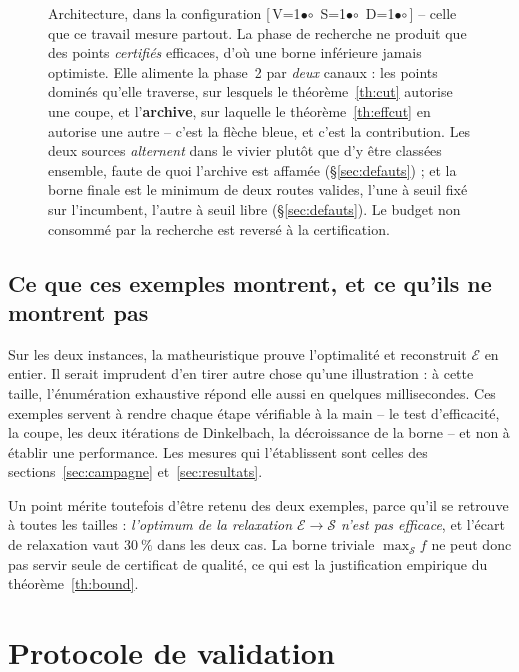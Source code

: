 \documentclass[11pt,a4paper]{article}
\theoremstyle{plain}
\theoremstyle{remark}
\newcommand{\Ecal}{\mathcal{E}}
\newcommand{\Scal}{\mathcal{S}}
\newcommand{\cfgm}[1]{\ifnum#1=1$\bullet$\else$\circ$\fi}
\newcommand{\conf}[3]{%
  \textsf{\footnotesize[\,V\cfgm{#1}\ S\cfgm{#2}\ D\cfgm{#3}\,]}}
\begin{document}
\begin{figure}[H]
\caption{Architecture, dans la configuration \conf{1}{1}{1} -- celle que ce
travail mesure partout. La phase de recherche ne produit que des points
\emph{certifiés} efficaces, d'où une borne inférieure jamais optimiste. Elle
alimente la phase~2 par \emph{deux} canaux : les points dominés qu'elle
traverse, sur lesquels le théorème~\ref{th:cut} autorise une coupe, et
l'\textbf{archive}, sur laquelle le théorème~\ref{th:effcut} en autorise une
autre -- c'est la flèche bleue, et c'est la contribution. Les deux sources
\emph{alternent} dans le vivier plutôt que d'y être classées ensemble, faute
de quoi l'archive est affamée (§\ref{sec:defauts}) ; et la borne finale est
le minimum de deux routes valides, l'une à seuil fixé sur l'incumbent,
l'autre à seuil libre (§\ref{sec:defauts}). Le budget non consommé par la
recherche est reversé à la certification.}
\label{fig:archi}
\end{figure}

\subsection{Ce que ces exemples montrent, et ce qu'ils ne montrent pas}

Sur les deux instances, la matheuristique prouve l'optimalité et reconstruit
$\Ecal$ en entier. Il serait imprudent d'en tirer autre chose qu'une
illustration : à cette taille, l'énumération exhaustive répond elle aussi en
quelques millisecondes. Ces exemples servent à rendre chaque étape
vérifiable à la main -- le test d'efficacité, la coupe, les deux itérations
de Dinkelbach, la décroissance de la borne -- et non à établir une
performance. Les mesures qui l'établissent sont celles des
sections~\ref{sec:campagne} et~\ref{sec:resultats}.

Un point mérite toutefois d'être retenu des deux exemples, parce qu'il se
retrouve à toutes les tailles : \emph{l'optimum de la relaxation
$\Ecal\to\Scal$ n'est pas efficace}, et l'écart de relaxation vaut $30\ \%$
dans les deux cas. La borne triviale $\max_{\Scal}f$ ne peut donc pas servir
seule de certificat de qualité, ce qui est la justification empirique du
théorème~\ref{th:bound}.

\section{Protocole de validation}
\end{document}
